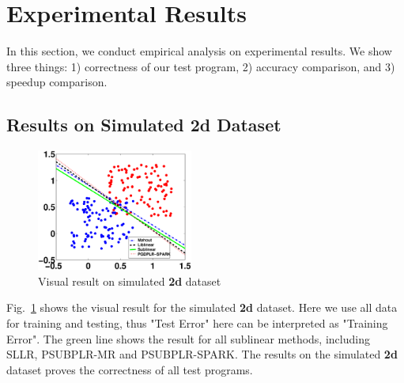 \documentclass[10pt, conference, compsocconf]{IEEEtran}
\begin{document}
\section{Experimental Results} \label{sec:experiment}
In this section, we conduct empirical analysis on experimental results.
We show three things: 1) correctness of our test program, 2) accuracy comparison, and 3) speedup comparison.

\subsection{Results on Simulated 2d Dataset}
%
\begin{figure}[tb]
\center \includegraphics[height=4cm,width=5.14cm]{img/2d-show.eps}\vspace{-0.3cm}
\caption{Visual result on simulated \textbf{2d} dataset}\label{fig:02}\vspace{-0.5cm}
\end{figure}
%
Fig.~\ref{fig:02} shows the visual result for the simulated \textbf{2d} dataset.
Here we use all data for training and testing, thus "Test Error" here can be interpreted as "Training Error".
The green line shows the result for all sublinear methods, including SLLR, PSUBPLR-MR and PSUBPLR-SPARK.
The results on the simulated \textbf{2d} dataset proves the correctness of all test programs.
\end{document}
